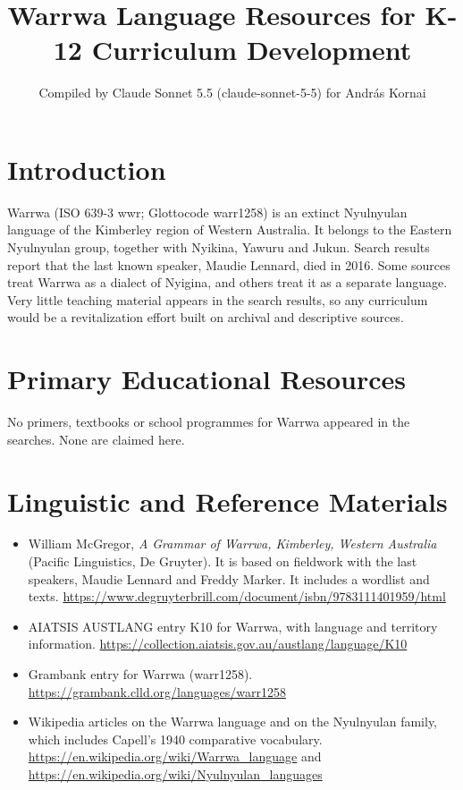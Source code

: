 \documentclass[12pt]{article}
\title{Warrwa Language Resources for K-12 Curriculum Development}
\author{Compiled by Claude Sonnet 5.5 (claude-sonnet-5-5) for Andr\'as Kornai}
\date{}
\begin{document}
\maketitle

\section{Introduction}
Warrwa (ISO 639-3 wwr; Glottocode warr1258) is an extinct Nyulnyulan language of the Kimberley region of Western Australia. It belongs to the Eastern Nyulnyulan group, together with Nyikina, Yawuru and Jukun. Search results report that the last known speaker, Maudie Lennard, died in 2016. Some sources treat Warrwa as a dialect of Nyigina, and others treat it as a separate language. Very little teaching material appears in the search results, so any curriculum would be a revitalization effort built on archival and descriptive sources.

\section{Primary Educational Resources}
No primers, textbooks or school programmes for Warrwa appeared in the searches. None are claimed here.

\section{Linguistic and Reference Materials}
\begin{itemize}
\item William McGregor, \emph{A Grammar of Warrwa, Kimberley, Western Australia} (Pacific Linguistics, De Gruyter). It is based on fieldwork with the last speakers, Maudie Lennard and Freddy Marker. It includes a wordlist and texts. \url{https://www.degruyterbrill.com/document/isbn/9783111401959/html}
\item AIATSIS AUSTLANG entry K10 for Warrwa, with language and territory information. \url{https://collection.aiatsis.gov.au/austlang/language/K10}
\item Grambank entry for Warrwa (warr1258). \url{https://grambank.clld.org/languages/warr1258}
\item Wikipedia articles on the Warrwa language and on the Nyulnyulan family, which includes Capell's 1940 comparative vocabulary. \url{https://en.wikipedia.org/wiki/Warrwa_language} and \url{https://en.wikipedia.org/wiki/Nyulnyulan_languages}
\end{itemize}
\end{document}
